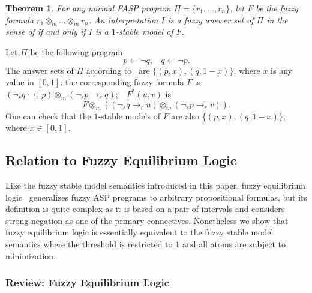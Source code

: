 \documentclass[runningheads]{llncs}
\def\ba{\begin{array}}
\def\ea{\end{array}}
\def\rar{\rightarrow}
\def\fand{\otimes}
\newtheorem{thm}{Theorem}
\begin{document}
\begin{thm}\label{thm:normal-fuzzysm}
For any normal FASP program $\Pi=\{r_1, \dots, r_n\}$, let $F$ be the
fuzzy formula $r_1\fand_m\dots\fand_m r_n$.
An interpretation $I$ is a fuzzy answer set of $\Pi$ in
the sense of \cite{lukasiewicz06fuzzy} if and only if $I$ is a
$1$-stable model of $F$. 
\end{thm}


\begin{example}
Let $\Pi$ be the following program
\[  
   p \leftarrow \neg q,\ \ \ \ 
   q \leftarrow \neg p.  
\]
The answer sets of $\Pi$ according to~\cite{lukasiewicz06fuzzy} are 
$\{(p, x), (q, 1-x)\}$, where $x$ is any value in $\left[0, 1\right]$: 
the corresponding fuzzy formula $F$ is 
$(\neg_{\!s} q \rar_r p) \fand_m (\neg_{\!s} p \rar_r q)$;\ \ 
$F^*(u,v)$ is
\[
  F\fand_m ((\neg_{\!s} q \rar_r u)\fand_m (\neg_{\!s} p \rar_r v)). 
\]
One can check that the $1$-stable models of $F$ are also 
$\{(p, x), (q, 1-x)\}$, where $x \in \left[0, 1\right]$.
\end{example}

\subsection{Relation to Fuzzy Equilibrium Logic} \label{ssec:fuzzy-equil} 

Like the fuzzy stable model semantics introduced in this paper, fuzzy
equilibrium logic~\cite{schockaert12fuzzy} generalizes fuzzy ASP programs to
arbitrary propositional formulas, but its definition is quite 
complex as it is based on a pair of intervals and considers strong
negation as one of the primary connectives. Nonetheless we show that fuzzy equilibrium logic is
essentially equivalent to the fuzzy stable model semantics where the
threshold is restricted to $1$ and all atoms are subject to minimization.

\vspace{-5mm}
\subsubsection{Review: Fuzzy Equilibrium Logic}
\end{document}
